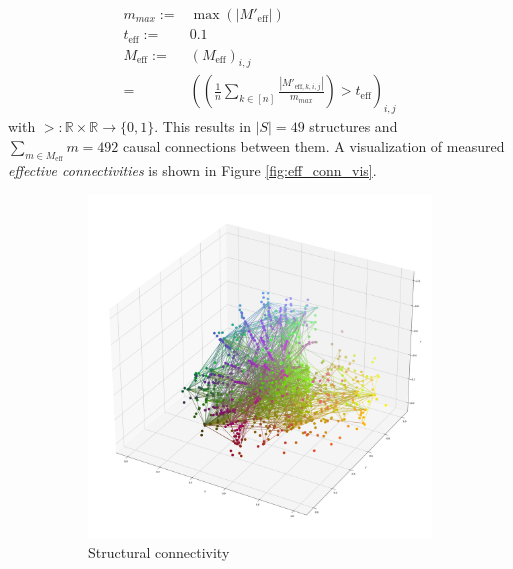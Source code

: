 \documentclass[]{article}
\begin{document}
\begin{align*}
	m_{max}:=& \max \left(\left|M'_{\text{eff}}\right|\right)\\
	t_{\text{eff}}:=& 0.1\\
	M_{\text{eff}}:=& \left(M_{\text{eff}}\right)_{i,j} \\
	=& \left(\left(\frac{1}{n}\sum_{k\in [n]}\frac{\left|M'_{\text{eff}, k,i,j}\right|}{m_{max}} \right) > t_{\text{eff}} \right)_{i,j}
\end{align*}
with $>:\mathbb{R}\times\mathbb{R}\rightarrow \{0,1\} $. 
This results in $|S|=49$ structures and $\sum_{m\in M_{\text{eff}} }m=492$ causal connections between them. A visualization of measured \textit{effective connectivities} is shown in Figure \ref{fig:eff_conn_vis}.

\begin{figure}
	\centering
	\begin{subfigure}{.3\textwidth}
		\centering
		\includegraphics[width=.9\linewidth]{plotted_figures/struc_3d_conn_plot.png}
		\caption{Structural connectivity}
		\label{fig:struc_conn_vis}
	\end{subfigure}
	\begin{subfigure}{.3\textwidth}
		\centering

\end{subfigure}
\end{figure}
\end{document}
